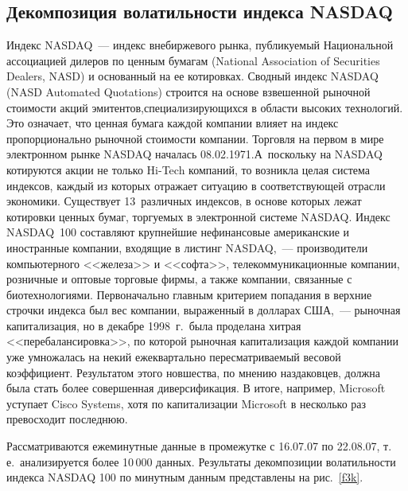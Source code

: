\begin{multicols}{2}
\subsection{Декомпозиция волатильности индекса NASDAQ}

Индекс NASDAQ~--- индекс внебиржевого рынка, публикуемый
Национальной ассоциацией дилеров по ценным бумагам (National
Association of Securities Dealers, NASD) и основанный на ее
котировках. Сводный индекс NASDAQ (NASD Automated Quotations) строится на основе
взвешенной рыночной стоимости акций эмитентов,\linebreak специализирующихся
в области высоких технологий. Это означает, что ценная бумага
каждой компании влияет на индекс пропорционально рыночной
стоимости компании. Тор\-гов\-ля на первом в мире электронном рынке
NASDAQ началась 08.02.1971.\linebreak А~поскольку на NASDAQ котируются
акции не только Hi-Tech компаний, то возникла целая сис\-те\-ма
индексов, каждый из которых отражает ситуацию в соответствующей
отрасли экономики. Существует 13~различных индексов, в
основе которых лежат котировки ценных бумаг, торгуемых в
электронной системе NASDAQ. Индекс NASDAQ~100 составляют
крупнейшие нефинансовые американские и иностранные компании,
входящие в листинг NASDAQ,~--- производители компьютерного
<<железа>> и <<софта>>, телекоммуникационные компании, розничные и
оптовые торговые фирмы, а также компании, связанные с
биотехнологиями. Первоначально главным критерием попадания в
верхние строчки индекса был вес компании, выраженный в долларах
США,~--- рыночная капитализация, но в декабре 1998~г.\ была
проделана хитрая <<перебалансировка>>, по которой рыночная
капитализация каждой компании уже умножалась на некий
ежеквартально пересматриваемый весовой коэффициент. Результатом
этого новшества, по мнению наздаковцев, должна была стать более
совершенная диверсификация. В итоге, например, Microsoft уступает
Cisco Systems, хотя по капитализации Microsoft в несколько раз
превосходит последнюю.

Рассматриваются ежеминутные данные в промежутке с 16.07.07 по
22.08.07, т.\,е.\ анализируется более 10\,000 данных. Результаты
декомпозиции волатильности индекса NASDAQ 100 по минутным данным
представлены на рис.~\ref{f3k}.


\end{multicols}
